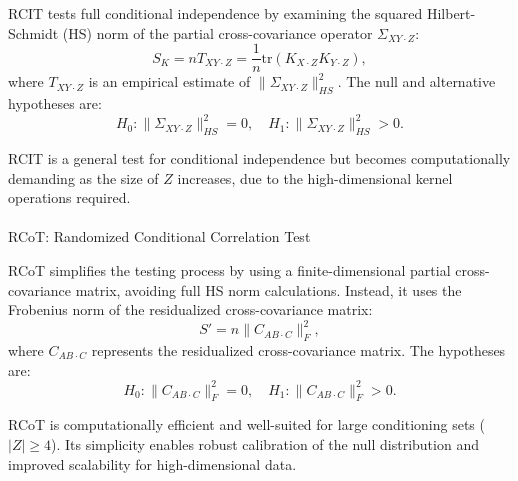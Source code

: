 \documentclass[
]{article}
\makeatletter
\let\oldparagraph\paragraph
\renewcommand{\paragraph}{
    \@ifstar
      \xxxParagraphStar
      \xxxParagraphNoStar
  }
\newcommand{\xxxParagraphStar}[1]{\oldparagraph*{#1}\mbox{}}
\newcommand{\xxxParagraphNoStar}[1]{\oldparagraph{#1}\mbox{}}
\makeatother
\begin{document}
RCIT tests full conditional independence by examining the squared
Hilbert-Schmidt (HS) norm of the partial cross-covariance operator
\(\Sigma_{XY \cdot Z}\): \[
S_K = n T_{XY \cdot Z} = \frac{1}{n} \text{tr}(K_{X \cdot Z} K_{Y \cdot Z}),
\] where \(T_{XY \cdot Z}\) is an empirical estimate of
\(\|\Sigma_{XY \cdot Z}\|^2_{HS}\). The null and alternative hypotheses
are: \[
H_0: \|\Sigma_{XY \cdot Z}\|^2_{HS} = 0, \quad H_1: \|\Sigma_{XY \cdot Z}\|^2_{HS} > 0.
\]

RCIT is a general test for conditional independence but becomes
computationally demanding as the size of \(Z\) increases, due to the
high-dimensional kernel operations required.

\paragraph{RCoT: Randomized Conditional Correlation
Test}\label{rcot-randomized-conditional-correlation-test}

RCoT simplifies the testing process by using a finite-dimensional
partial cross-covariance matrix, avoiding full HS norm calculations.
Instead, it uses the Frobenius norm of the residualized cross-covariance
matrix: \[
S' = n \|C_{AB \cdot C}\|_F^2,
\] where \(C_{AB \cdot C}\) represents the residualized cross-covariance
matrix. The hypotheses are: \[
H_0: \|C_{AB \cdot C}\|_F^2 = 0, \quad H_1: \|C_{AB \cdot C}\|_F^2 > 0.
\]

RCoT is computationally efficient and well-suited for large conditioning
sets (\(|Z| \geq 4\)). Its simplicity enables robust calibration of the
null distribution and improved scalability for high-dimensional data.
\end{document}
